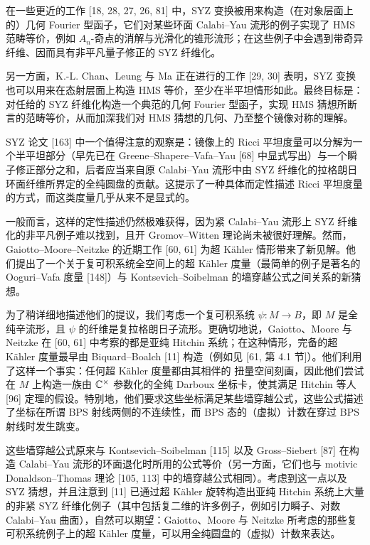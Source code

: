 在一些更近的工作 [18, 28, 27, 26, 81] 中，SYZ 变换被用来构造（在对象层面上的）几何 Fourier 型函子，它们对某些环面 Calabi--Yau 流形的例子实现了 HMS 范畴等价，例如 $A_n$-奇点的消解与光滑化的锥形流形；在这些例子中会遇到带奇异纤维、因而具有非平凡量子修正的 SYZ 纤维化。

另一方面，K.-L. Chan、Leung 与 Ma 正在进行的工作 [29, 30] 表明，SYZ 变换也可以用来在态射层面上构造 HMS 等价，至少在半平坦情形如此。最终目标是：对任给的 SYZ 纤维化构造一个典范的几何 Fourier 型函子，实现 HMS 猜想所断言的范畴等价，从而加深我们对 HMS 猜想的几何、乃至整个镜像对称的理解。

SYZ 论文 [163] 中一个值得注意的观察是：镜像上的 Ricci 平坦度量可以分解为一个半平坦部分（早先已在 Greene--Shapere--Vafa--Yau [68] 中显式写出）与一个瞬子修正部分之和，后者应当来自原 Calabi--Yau 流形中由 SYZ 纤维化的拉格朗日环面纤维所界定的全纯圆盘的贡献。这提示了一种具体而定性描述 Ricci 平坦度量的方式，而这类度量几乎从来不是显式的。

一般而言，这样的定性描述仍然极难获得，因为紧 Calabi--Yau 流形上 SYZ 纤维化的非平凡例子难以找到，且开 Gromov--Witten 理论尚未被很好理解。然而，Gaiotto--Moore--Neitzke 的近期工作 [60, 61] 为超 Kähler 情形带来了新见解。他们提出了一个关于复可积系统全空间上的超 Kähler 度量（最简单的例子是著名的 Ooguri--Vafa 度量 [148]）与 Kontsevich--Soibelman 的墙穿越公式之间关系的新猜想。

为了稍详细地描述他们的提议，我们考虑一个复可积系统 $\psi:M\to B$，即 $M$ 是全纯辛流形，且 $\psi$ 的纤维是复拉格朗日子流形。更确切地说，Gaiotto、Moore 与 Neitzke 在 [60, 61] 中考察的都是亚纯 Hitchin 系统；在这种情形，完备的超 Kähler 度量最早由 Biquard--Boalch [11] 构造（例如见 [61, 第 4.1 节]）。他们利用了这样一个事实：任何超 Kähler 度量都由其相伴的 扭量空间刻画，因此他们尝试在 $M$ 上构造一族由 $\mathbb{C}^\times$ 参数化的全纯 Darboux 坐标卡，使其满足 Hitchin 等人 [96] 定理的假设。特别地，他们要求这些坐标满足某些墙穿越公式，这些公式描述了坐标在所谓 BPS 射线两侧的不连续性，而 BPS 态的（虚拟）计数在穿过 BPS 射线时发生跳变。

这些墙穿越公式原来与 Kontsevich--Soibelman [115] 以及 Gross--Siebert [87] 在构造 Calabi--Yau 流形的环面退化时所用的公式等价（另一方面，它们也与 motivic Donaldson--Thomas 理论 [105, 113] 中的墙穿越公式相同）。考虑到这一点以及 SYZ 猜想，并且注意到 [11] 已通过超 Kähler 旋转构造出亚纯 Hitchin 系统上大量的非紧 SYZ 纤维化例子（其中包括复二维的许多例子，例如引力瞬子、对数 Calabi--Yau 曲面），自然可以期望：Gaiotto、Moore 与 Neitzke 所考虑的那些复可积系统例子上的超 Kähler 度量，可以用全纯圆盘的（虚拟）计数来表达。

